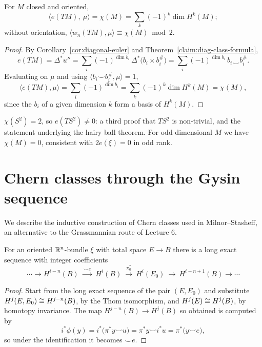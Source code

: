 \begin{theorem}\label{thm:euler-char}
For $M$ closed and oriented,
\[
\big\langle e(TM),\ \mu\big\rangle=\chi(M)=\sum_k(-1)^k\dim H^k(M);
\]
without orientation, $\langle w_n(TM),\mu\rangle\equiv\chi(M)\bmod 2$.
\end{theorem}

\begin{proof}
By Corollary~\ref{cor:diagonal-euler} and
Theorem~\ref{claim:diag-class-formula},
\[
e(TM)=\Delta^*u''=\sum_i(-1)^{\dim b_i}\,\Delta^*\big(b_i\times b_i^\#\big)
=\sum_i(-1)^{\dim b_i}\,b_i\smile b_i^{\#} .
\]
Evaluating on $\mu$ and using $\langle b_i\smile b_i^\#,\mu\rangle=1$,
\[
\big\langle e(TM),\mu\big\rangle=\sum_i(-1)^{\dim b_i}
=\sum_k(-1)^k\dim H^k(M)=\chi(M),
\]
since the $b_i$ of a given dimension $k$ form a basis of $H^k(M)$.
\end{proof}

\begin{example}
$\chi(S^2)=2$, so $e(TS^2)\neq0$: a third proof that $TS^2$ is non-trivial, and
the statement underlying the hairy ball theorem. For odd-dimensional $M$ we have
$\chi(M)=0$, consistent with $2e(\xi)=0$ in odd rank.
\end{example}

\section{Chern classes through the Gysin sequence}

We describe the inductive construction of Chern classes used in
Milnor--Stasheff, an alternative to the Grassmannian route of Lecture 6.

\begin{theorem}\label{thm:gysin}
For an oriented $\mathbb{R}^n$-bundle $\xi$ with total space $E\to B$ there is a long
exact sequence with integer coefficients
\[
\cdots\to H^{i-n}(B)\ \xrightarrow{\ \smile e\ }\ H^{i}(B)
\ \xrightarrow{\ \pi_0^*\ }\ H^{i}(E_0)\ \to\ H^{i-n+1}(B)\to\cdots
\]
\end{theorem}

\begin{proof}
Start from the long exact sequence of the pair $(E,E_0)$ and substitute
$H^{j}(E,E_0)\cong H^{j-n}(B)$, by the Thom isomorphism, and
$H^j(E)\cong H^j(B)$, by homotopy invariance. The map
$H^{j-n}(B)\to H^{j}(B)$ so obtained is computed by
\[
i^*\phi(y)=i^*\big(\pi^*y\smile u\big)=\pi^*y\smile i^*u=\pi^*\big(y\smile e\big),
\]
so under the identification it becomes $\smile e$.
\end{proof}

